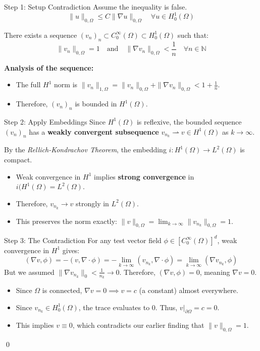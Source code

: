 \documentclass[aspectratio=169]{beamer}
\begin{document}
\begin{frame}{Step 1: Setup Contradiction}
    Assume the inequality is false.
    \[
        \|u\|_{0,\Omega} \le C\|\nabla u\|_{0,\Omega} \quad \forall u \in H^1_0(\Omega) \text{}
    \]

    There exists a sequence $(v_n)_n \subset C^\infty_0(\Omega) \subset H^1_0(\Omega)$ such that:
    \[
        \|v_n\|_{0,\Omega} = 1 \quad \text{and} \quad \|\nabla v_n\|_{0,\Omega} < \frac{1}{n} \quad \forall n \in \mathbb{N} \text{}
    \]

    \textbf{Analysis of the sequence:}
    \begin{itemize}
        \item The full $H^1$ norm is $\|v_n\|_{1,\Omega} = \|v_n\|_{0,\Omega} + \|\nabla v_n\|_{0,\Omega} < 1 + \frac{1}{n}$.
        \item Therefore, $(v_n)_n$ is bounded in $H^1(\Omega)$.
    \end{itemize}
\end{frame}

\begin{frame}{Step 2: Apply Embeddings}
    Since $H^1(\Omega)$ is reflexive, the bounded sequence $(v_n)_n$ has a \textbf{weakly convergent subsequence} $v_{n_k} \rightharpoonup v \in H^1(\Omega)$ as $k\to\infty$.

    \vspace{0.3cm}
    By the \textit{Rellich-Kondrachov Theorem}, the embedding $i:H^1(\Omega) \to L^2(\Omega)$ is compact.
    \begin{itemize}
        \item Weak convergence in $H^1$ implies \textbf{strong convergence} in $i(H^1(\Omega) = L^2(\Omega)$.
        \item Therefore, $v_{n_k} \to v$ strongly in $L^2(\Omega)$.
        \item This preserves the norm exactly: $\|v\|_{0,\Omega} = \lim_{k\to\infty} \|v_{n_k}\|_{0,\Omega} = 1$.
    \end{itemize}
\end{frame}

\begin{frame}{Step 3: The Contradiction}
    For any test vector field $\phi \in [C^\infty_0(\Omega)]^d$, weak convergence in $H^1$ gives:
    \[
        (\nabla v, \phi) = -(v, \nabla \cdot \phi) = -\lim_{k\to\infty} (v_{n_k}, \nabla \cdot \phi) = \lim_{k\to\infty} (\nabla v_{n_k}, \phi) \text{}
    \]
    But we assumed $\|\nabla v_{n_k}\|_0 < \frac{1}{n_k} \to 0$. Therefore, $(\nabla v, \phi) = 0$, meaning $\nabla v = 0$.

    \vspace{0.3cm}
    \begin{itemize}
        \item Since $\Omega$ is connected, $\nabla v = 0 \implies v = c$ (a constant) almost everywhere.
        \item Since $v_{n_k} \in H^1_0(\Omega)$, the trace evaluates to 0. Thus, $v|_{\partial\Omega} = c = 0$.
        \item This implies $v \equiv 0$, which contradicts our earlier finding that $\|v\|_{0,\Omega} = 1$.
    \end{itemize}
    \qed
\end{frame}
\end{document}
